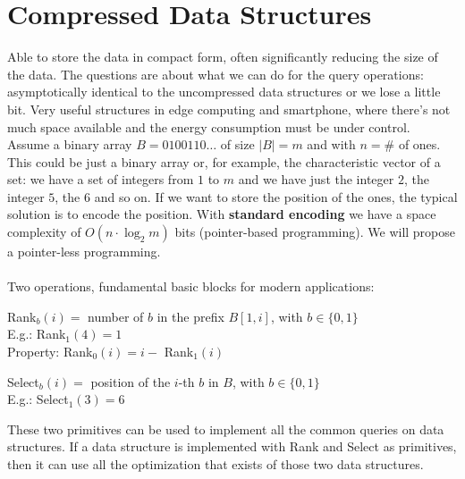 \documentclass[10pt]{report}
\begin{document}
\section{Compressed Data Structures} Able to store the data in compact form, often significantly reducing the size of the data. The questions are about what we can do for the query operations: asymptotically identical to the uncompressed data structures or we lose a little bit. Very useful structures in edge computing and smartphone, where there's not much space available and the energy consumption must be under control.\\
Assume a binary array $B=0100110\ldots$ of size $|B| = m$ and with $n = \#$ of ones. This could be just a binary array or, for example, the characteristic vector of a set: we have a set of integers from $1$ to $m$ and we have just the integer $2$, the integer $5$, the $6$ and so on. If we want to store the position of the ones, the typical solution is to encode the position. With \textbf{standard encoding} we have a space complexity of $O(n\cdot\log_2 m)$ bits (pointer-based programming). We will propose a pointer-less programming.\\\\
Two operations, fundamental basic blocks for modern applications: \begin{list}{}{}
	\item Rank$_b(i) =$ number of $b$ in the prefix $B[1,i]$, with $b\in\{0,1\}$\\
	E.g.: Rank$_1(4) = 1$\\
	Property: Rank$_0(i) = i -$ Rank$_1(i)$
	\item Select$_b(i) =$ position of the $i$-th $b$ in $B$, with $b\in\{0,1\}$\\
	E.g.: Select$_1(3) = 6$
\end{list}
These two primitives can be used to implement all the common queries on data structures. If a data structure is implemented with Rank and Select as primitives, then it can use all the optimization that exists of those two data structures.
\end{document}
